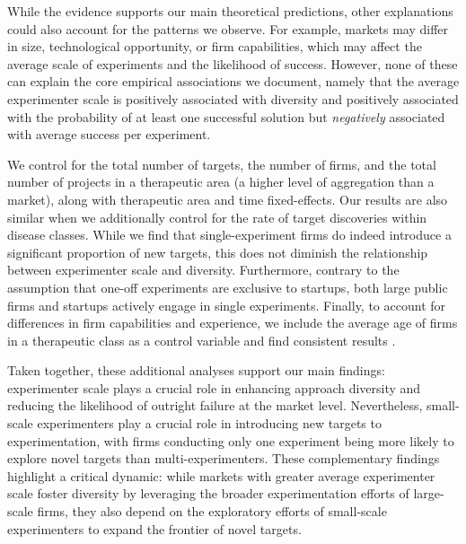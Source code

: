 While the evidence supports our main theoretical predictions, other explanations could also account for the patterns we observe. For example, markets may differ in size, technological opportunity, or firm capabilities, which may affect the average scale of experiments and the likelihood of success. However, none of these can explain the core empirical associations we document, namely that the average experimenter scale is positively associated with diversity and positively associated with the probability of at least one successful solution but \textit{negatively} associated with average success per experiment. 


We control for the total number of targets, the number of firms, and the total number of projects in a therapeutic area (a higher level of aggregation than a market), along with therapeutic area and time fixed-effects. Our results are also similar when we additionally control for the rate of target discoveries within disease classes. While we find that single-experiment firms do indeed introduce a significant proportion of new targets, this does not diminish the relationship between experimenter scale and diversity. Furthermore, contrary to the assumption that one-off experiments are exclusive to startups, both large public firms and startups actively engage in single experiments.  Finally, to account for differences in firm capabilities and experience, we include the average age of firms in a therapeutic class as a control variable and find consistent results \citep{krieger2022missing}.


Taken together, these additional analyses support our main findings: experimenter scale plays a crucial role in enhancing approach diversity and reducing the likelihood of outright failure at the market level. Nevertheless, small-scale experimenters play a crucial role in introducing new targets to experimentation, with firms conducting only one experiment being more likely to explore novel targets than multi-experimenters. These complementary findings highlight a critical dynamic: while markets with greater average experimenter scale foster diversity by leveraging the broader experimentation efforts of large-scale firms, they also depend on the exploratory efforts of small-scale experimenters to expand the frontier of novel targets.


